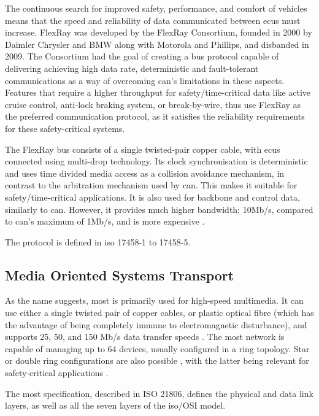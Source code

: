 The continuous search for improved safety, performance, and comfort of vehicles means that the speed and reliability of data communicated between \glspl{ecu} must increase. FlexRay was developed by the FlexRay Consortium, founded in 2000 by Daimler Chrysler and BMW along with Motorola and Phillips, and disbanded in 2009. The Consortium had the goal of creating a bus protocol capable of delivering achieving high data rate, deterministic and fault-tolerant communications \citep{FlexRayFreescale} as a way of overcoming \gls{can}'s limitations in these aspects. Features that require a higher throughput for safety/time-critical data like active cruise control, anti-lock braking system, or break-by-wire, thus use FlexRay as the preferred communication protocol, as it satisfies the reliability requirements for these safety-critical systems.\par

The FlexRay bus consists of a single twisted-pair copper cable, with \glspl{ecu} connected using multi-drop technology. Its clock synchronisation is deterministic and uses time divided media access as a collision avoidance mechanism, in contrast to the arbitration mechanism used by \gls{can}. This makes it suitable for safety/time-critical applications. It is also used for backbone and control data, similarly to \gls{can}. However, it provides much higher bandwidth: 10Mb/s, compared to \gls{can}'s maximum of 1Mb/s, and is more expensive \citep{Huang2019}.\par

The protocol is defined in \gls{iso} 17458-1 to 17458-5.

\subsection{Media Oriented Systems Transport}

As the name suggests, \gls{most} is primarily used for high-speed multimedia. It can use either a single twisted pair of copper cables, or plastic optical fibre (which has the advantage of being completely immune to electromagnetic disturbance), and supports 25, 50, and 150 Mb/s data transfer speeds \citep{MOSTMicrochip}. The \gls{most} network is capable of managing up to 64 devices, usually configured in a ring topology. Star or double ring configurations are also possible \citep{MOSTVector}, with the latter being relevant for safety-critical applications \citep{Huang2019}.\par

The \gls{most} specification, described in ISO 21806, defines the physical and data link layers, as well as all the seven layers of the \gls{iso}/OSI model.


